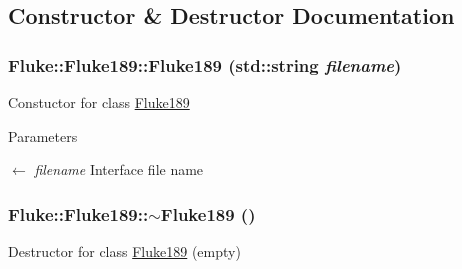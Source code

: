 \subsection{Constructor \& Destructor Documentation}
\hypertarget{classFluke_1_1Fluke189_a2a8bd6a44e96762e278809e016033e58}{
\subsubsection[{Fluke189}]{\setlength{\rightskip}{0pt plus 5cm}Fluke::Fluke189::Fluke189 (std::string {\em filename})}}
\label{classFluke_1_1Fluke189_a2a8bd6a44e96762e278809e016033e58}
Constuctor for class \hyperlink{classFluke_1_1Fluke189}{Fluke189} 
\begin{DoxyParams}{Parameters}
\item[\mbox{$\leftarrow$} {\em filename}]Interface file name \end{DoxyParams}
\hypertarget{classFluke_1_1Fluke189_aef4bad0cc4186a053a0dd4286ae3a679}{
\subsubsection[{$\sim$Fluke189}]{\setlength{\rightskip}{0pt plus 5cm}Fluke::Fluke189::$\sim$Fluke189 ()}}
\label{classFluke_1_1Fluke189_aef4bad0cc4186a053a0dd4286ae3a679}
Destructor for class \hyperlink{classFluke_1_1Fluke189}{Fluke189} (empty) 

